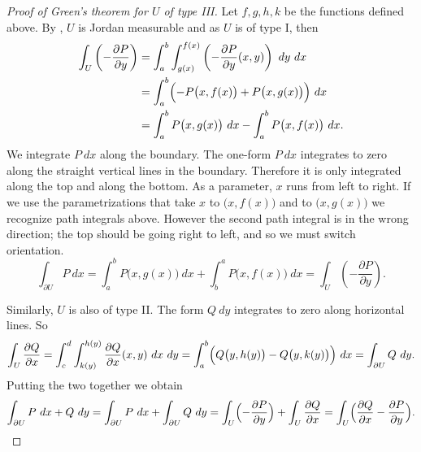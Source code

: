 \begin{proof}[Proof of Green's theorem for $U$ of type III]
Let $f,g,h,k$ be the functions defined above.
By ,
$U$ is Jordan measurable and as $U$ is of type I, then
\begin{equation*}
\begin{split}
\int_U 
\left(- \frac{\partial P}{\partial y} \right)
& =
\int_a^b \int_{g(x)}^{f(x)}
\left(- \frac{\partial P}{\partial y} (x,y) \right)
~ dy ~ dx 
\\
& =
\int_a^b \Bigl(
- P\bigl(x,f(x)\bigr) +
P\bigl(x,g(x)\bigr)
\Bigr) ~ dx
\\
& =
\int_a^b P\bigl(x,g(x)\bigr) ~ dx 
-
\int_a^b P\bigl(x,f(x)\bigr) ~ dx .
\end{split}
\end{equation*}
We integrate $P~dx$ along the boundary.
The one-form $P~dx$ integrates to zero 
along the straight vertical lines in the boundary.  Therefore it is
only
integrated along the top and along the bottom.  As a parameter,
$x$ runs from left to right.  If we use the parametrizations that take $x$
to $\bigl(x,f(x)\bigr)$ and to
$\bigl(x,g(x)\bigr)$ we recognize path integrals above.  However the second
path integral is in the wrong direction; the top should be going right to
left, and so we must switch orientation.
\begin{equation*}
\int_{\partial U} P ~ dx
=
\int_a^b P\bigl(x,g(x)\bigr) ~ dx 
+
\int_b^a P\bigl(x,f(x)\bigr) ~ dx
=
\int_U 
\left(- \frac{\partial P}{\partial y} \right) .
\end{equation*}

Similarly, $U$ is also of type II.  The form $Q~dy$ integrates to zero along
horizontal lines.   So
\begin{equation*}
\int_U 
\frac{\partial Q}{\partial x}
=
\int_c^d \int_{k(y)}^{h(y)}
\frac{\partial Q}{\partial x}(x,y)
~ dx ~ dy 
=
\int_a^b \Bigl(
Q\bigl(y,h(y)\bigr) 
-
Q\bigl(y,k(y)\bigr)
\Bigr) ~ dx 
=
\int_{\partial U} Q ~ dy .
\end{equation*}
Putting the two together we obtain
\begin{equation*}
\int_{\partial U} P~ dx + Q ~ dy 
=
\int_{\partial U} P~ dx + \int_{\partial U} Q ~ dy 
=
\int_U 
\Bigl(-\frac{\partial P}{\partial y}\Bigr)
+
\int_U 
\frac{\partial Q}{\partial x}
=
\int_U 
\Bigl(
\frac{\partial Q}{\partial x}
-\frac{\partial P}{\partial y}
\Bigr) . \qedhere
\end{equation*}
\end{proof}

